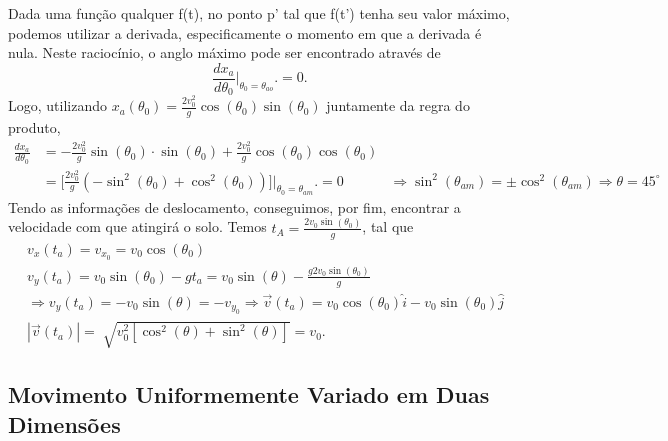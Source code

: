 \documentclass[PhysicsI/physics_notes.tex]{subfiles}
\begin{document}
Dada uma função qualquer f(t), no ponto p' tal que f(t') tenha seu valor máximo, podemos utilizar a derivada, especificamente
o momento em que a derivada é nula. Neste raciocínio, o anglo máximo pode ser encontrado através de
$$
	\frac{dx_{a}}{d\theta _{0}} \biggl|_{\theta_{0}=\theta_{ao}}^{}\biggr. = 0.
$$
Logo, utilizando $x_{a}(\theta_{0}) = \frac{2v_{0}^{2}}{g}\cos{(\theta_{0})}\sin{(\theta_{0})}$ juntamente da regra do produto,
\begin{align*}
	\frac{dx_{a}}{d\theta _{0}} & = -\frac{2v_{0}^{2}}{g}\sin{(\theta_{0})}\cdot \sin{(\theta_{0})} + \frac{2v_{0}^{2}}{g}\cos{(\theta_{0})}\cos{(\theta_{0})}       \\
	                            & = \biggl[\frac{2v_{0}^{2}}{g}(-\sin^{2}{(\theta_{0})}+\cos^{2}{(\theta_{0})})\biggr]\biggl|_{\theta_{0}=\theta_{am}}^{}\biggr. = 0
	                            & \Rightarrow \sin^{2}{(\theta_{am})}=\pm\cos^{2}{(\theta_{am})} \Rightarrow \boxed{\theta =45^{\circ}}
\end{align*}
Tendo as informações de deslocamento, conseguimos, por fim, encontrar a velocidade com que atingirá o solo. Temos
$t_{A} = \frac{2v_{0}\sin{(\theta_{0})}}{g}$, tal que
\begin{align*}
	 & v_{x}(t_{a}) = v_{x_{0}} = v_{0}\cos{(\theta_{0})}                                                                                                          \\
	 & v_{y}(t_{a}) = v_{0}\sin{(\theta_{0})}-gt_{a} = v_{0}\sin{(\theta )} - \frac{g2v_{0}\sin{(\theta _0)}}{g}                                                   \\
	 & \Rightarrow  v_{y}(t_{a}) = -v_{0}\sin{(\theta )} = -v_{y_{0}} \Rightarrow \vec{v}(t_{a}) = v_{0}\cos{(\theta_{0})}\hat{i} - v_{0}\sin{(\theta_{0})}\hat{j} \\
	 & |\vec{v}(t_{a})| = \sqrt[]{v_{0}^{2}[\cos^{2}{(\theta )}+\sin^{2}{(\theta )}]} = v_{0}.
\end{align*}

\subsection{Movimento Uniformemente Variado em Duas Dimensões}
\end{document}
